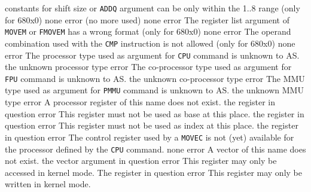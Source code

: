 \documentclass[12pt,twoside]{report}
\newcommand{\tty}[1]{{\tt #1}}
\newcommand{\asname}{{AS}}
\begin{document}
\begin{description}
               {constants for shift size or \tty{ADDQ} argument can be only
                within the 1..8 range (only for 680x0)}
               {none}
               {error}
               {(no more used)}
               {none}
               {error}
               {The register list argument of \tty{MOVEM} or \tty{FMOVEM} has a
                wrong format (only for 680x0)}
               {none}
               {error}
               {The operand combination used with the \tty{CMP} instruction is
                not allowed (only for 680x0)}
               {none}
               {error}
               {The processor type used as argument for \tty{CPU} command is
                unknown to \asname{}.}
               {the unknown processor type}
               {error}
               {The co-processor type used as argument for \tty{FPU} command is
                unknown to \asname{}.}
               {the unknown co-processor type}
               {error}
               {The MMU type used as argument for \tty{PMMU} command is
                unknown to \asname{}.}
               {the unknown MMU type}
               {error}
               {A processor register of this name does not exist.}
               {the register in question}
               {error}
               {This register must not be used as base at this place.}
               {the register in question}
               {error}
               {This register must not be used as index at this place.}
               {the register in question}
               {error}
               {The control register used by a \tty{MOVEC} is not (yet) available
                for the processor defined by the \tty{CPU} command.}
               {none}
               {error}
               {A vector of this name does not exist.}
               {the vector argument in question}
               {error}
               {This register may only be accessed in kernel mode.}
               {The register in question}
               {error}
               {This register may only be written in kernel mode.}

\end{description}
\end{document}
